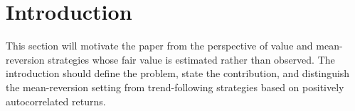 \section{Introduction}

This section will motivate the paper from the perspective of value and mean-reversion strategies whose fair value is estimated rather than observed. The introduction should define the problem, state the contribution, and distinguish the mean-reversion setting from trend-following strategies based on positively autocorrelated returns.
